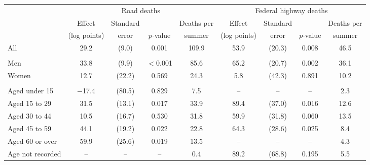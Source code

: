 \begin{tabular}{@{}l cccc cccc@{}}
\toprule
 & \multicolumn{4}{c}{Road deaths} & \multicolumn{4}{c}{Federal highway deaths} \\
\cmidrule(lr){2-5}\cmidrule(l){6-9}
 & Effect & Standard & & Deaths per & Effect & Standard & & Deaths per \\
 & (log points) & error & $p$-value & summer & (log points) & error & $p$-value & summer \\
\midrule
All & 29.2 & (9.0) & 0.001 & 109.9 & 53.9 & (20.3) & 0.008 & 46.5 \\
\addlinespace
\multicolumn{9}{@{}l}{\textit{Panel A. Sex}} \\
Men & 33.8 & (9.9) & $<$0.001 & 85.6 & 65.2 & (20.7) & 0.002 & 36.1 \\
Women & 12.7 & (22.2) & 0.569 & 24.3 & 5.8 & (42.3) & 0.891 & 10.2 \\
\addlinespace
\multicolumn{9}{@{}l}{\textit{Panel B. Age}} \\
Aged under 15 & $-$17.4 & (80.5) & 0.829 & 7.5 & -- & -- & -- & 2.3 \\
Aged 15 to 29 & 31.5 & (13.1) & 0.017 & 33.9 & 89.4 & (37.0) & 0.016 & 12.6 \\
Aged 30 to 44 & 10.5 & (16.7) & 0.530 & 31.8 & 59.9 & (31.8) & 0.060 & 13.5 \\
Aged 45 to 59 & 44.1 & (19.2) & 0.022 & 22.8 & 64.3 & (28.6) & 0.025 & 8.4 \\
Aged 60 or over & 59.9 & (25.6) & 0.019 & 13.5 & -- & -- & -- & 4.3 \\
Age not recorded & -- & -- & -- & 0.4 & 89.2 & (68.8) & 0.195 & 5.5 \\
\bottomrule
\end{tabular}
